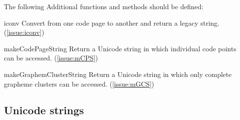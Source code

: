 \documentclass[b4paper]{article}
\begin{document}
The following Additional functions and methods should be defined:
\begin{definition}
\item [iconv] %
Convert from one code page to another and return a legacy string. (\cref{issue:iconv})
\item [makeCodePageString] %
Return a Unicode string in which individual code points can be accessed. (\cref{issue:mCPS})
\item [makeGraphemClusterString] %
Return a Unicode string in which only complete grapheme clusters can be accessed. (\cref{issue:mGCS})
\end{definition}

\subsection{Unicode strings}
\end{document}
